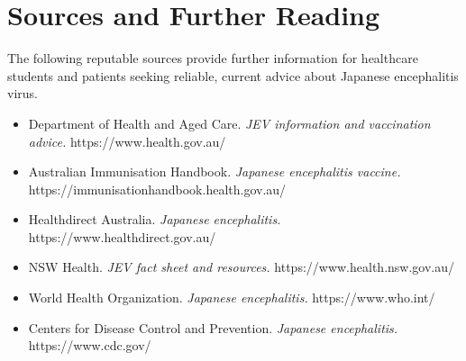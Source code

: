 \section*{Sources and Further Reading}
The following reputable sources provide further information for healthcare students and patients seeking reliable, current advice about Japanese encephalitis virus.
\begin{itemize}
    \item Department of Health and Aged Care. \textit{JEV information and vaccination advice.} https://www.health.gov.au/
    \item Australian Immunisation Handbook. \textit{Japanese encephalitis vaccine.} https://immunisationhandbook.health.gov.au/
    \item Healthdirect Australia. \textit{Japanese encephalitis.} https://www.healthdirect.gov.au/
    \item NSW Health. \textit{JEV fact sheet and resources.} https://www.health.nsw.gov.au/
    \item World Health Organization. \textit{Japanese encephalitis.} https://www.who.int/
    \item Centers for Disease Control and Prevention. \textit{Japanese encephalitis.} https://www.cdc.gov/
\end{itemize}

